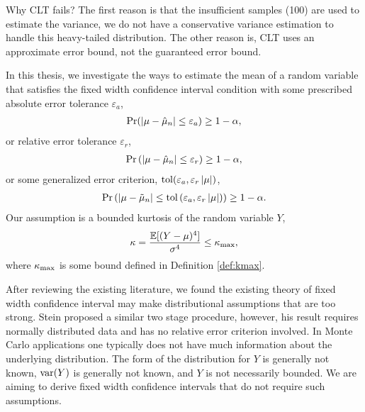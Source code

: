 \documentclass{iitthesis}
\theoremstyle{definition}
\begin{document}
Why CLT fails? The first reason is that the insufficient samples (100) are used to estimate the variance, we do not have a conservative variance estimation to handle this heavy-tailed distribution. The other reason is, CLT uses an approximate error bound, not the guaranteed error bound.

In this thesis, we investigate the ways to estimate the mean of a random variable that satisfies the fixed width confidence interval condition with some prescribed absolute error tolerance $\varepsilon_a$,  
\begin{align}\label{absCI}
\Pr(\left \lvert \mu-\hat{\mu}_n \right \rvert \leq \varepsilon_a) \geq 1-\alpha,
\end{align}
or relative error tolerance $\varepsilon_r$,
\begin{align}\label{relCI}
\Pr\left(\left \lvert \mu-\hat{\mu}_n \right \rvert\leq \varepsilon_r\right) \geq 1-\alpha,
\end{align}
or some generalized error criterion, $\operatorname{tol}(\varepsilon_a,\varepsilon_r \left \lvert \mu \right \rvert)$, 
\begin{align}\label{hybridCI}
\Pr\left(\left \lvert \mu-\tilde{\mu}_n \right \rvert\leq \operatorname{tol}\left(\varepsilon_a, \varepsilon_r\left \lvert \mu \right \rvert\right)\right) \geq 1-\alpha.
\end{align}
Our assumption is a bounded kurtosis of the random variable $Y$,
\begin{equation} \label{def:boundedkurtosis}
\kappa = \frac{\mathbb{E}[(Y-\mu)^4]}{\sigma^4} \le \kappa_{\max},
\end{equation}
where $\kappa_{\max}$ is some bound defined in Definition \ref{def:kmax}. 

After reviewing the existing literature, we found the existing theory of fixed width confidence interval may make distributional assumptions that are too strong. Stein \cite{stein45} proposed a similar two stage procedure, however, his result requires normally distributed data and has no relative error criterion involved. In Monte Carlo applications one typically does not have much information about the underlying distribution. The form of the distribution for $Y$ is generally not known, $\operatorname{var}(Y)$ is generally not  known, and $Y$ is not necessarily bounded. We are aiming to derive fixed width confidence intervals that do not require such assumptions.  
\end{document}
